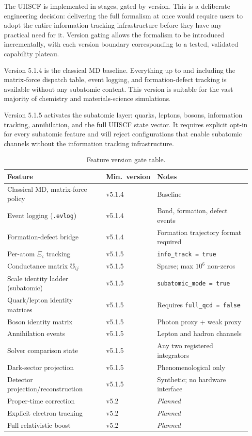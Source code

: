 \documentclass[11pt,a4paper]{article}
\newcommand{\Rec}{\Xi}
\newcommand{\Cond}{\mho}
\begin{document}
The UIISCF is implemented in stages, gated by version.  This is a deliberate
engineering decision: delivering the full formalism at once would require
users to adopt the entire information-tracking infrastructure before they
have any practical need for it.  Version gating allows the formalism to be
introduced incrementally, with each version boundary corresponding to a
tested, validated capability plateau.

Version 5.1.4 is the classical MD baseline.  Everything up to and including
the matrix-force dispatch table, event logging, and formation-defect tracking
is available without any subatomic content.  This version is suitable for
the vast majority of chemistry and materials-science simulations.

Version 5.1.5 activates the subatomic layer: quarks, leptons, bosons,
information tracking, annihilation, and the full UIISCF state vector.  It
requires explicit opt-in for every subatomic feature and will reject
configurations that enable subatomic channels without the information tracking
infrastructure.

\begin{table}[H]
\centering
\caption{Feature version gate table.}
\label{tab:version}
\begin{tabular}{@{}llp{7.2cm}@{}}
\toprule
Feature & Min.\ version & Notes \\
\midrule
Classical MD, matrix-force policy  & v5.1.4 & Baseline \\
Event logging (\texttt{.evlog})    & v5.1.4 & Bond, formation, defect events \\
Formation-defect bridge            & v5.1.4 & Formation trajectory format required \\
Per-atom $\Rec_i$ tracking         & v5.1.5 & \texttt{info\_track = true} \\
Conductance matrix $\Cond_{ij}$    & v5.1.5 & Sparse; max $10^6$ non-zeros \\
Scale identity ladder (subatomic)  & v5.1.5 & \texttt{subatomic\_mode = true} \\
Quark/lepton identity matrices     & v5.1.5 & Requires \texttt{full\_qcd = false} \\
Boson identity matrix              & v5.1.5 & Photon proxy + weak proxy \\
Annihilation events                & v5.1.5 & Lepton and hadron channels \\
Solver comparison state            & v5.1.5 & Any two registered integrators \\
Dark-sector projection             & v5.1.5 & Phenomenological only \\
Detector projection/reconstruction & v5.1.5 & Synthetic; no hardware interface \\
Proper-time correction             & v5.2   & \textit{Planned} \\
Explicit electron tracking         & v5.2   & \textit{Planned} \\
Full relativistic boost            & v5.2   & \textit{Planned} \\
\bottomrule
\end{tabular}
\end{table}
\end{document}
